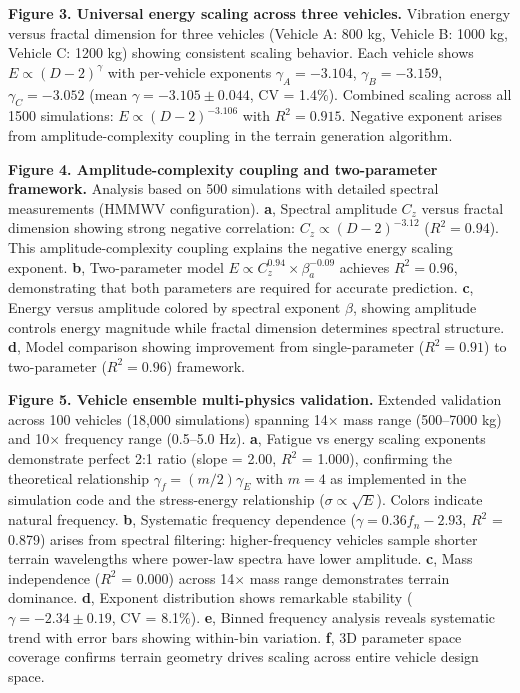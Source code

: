 \documentclass[11pt,letterpaper]{article}
\begin{document}
\textbf{Figure 3. Universal energy scaling across three vehicles.} 
Vibration energy versus fractal dimension for three vehicles (Vehicle A: 800 kg, Vehicle B: 1000 kg, Vehicle C: 1200 kg) showing consistent scaling behavior. Each vehicle shows $E \propto (D-2)^{\gamma}$ with per-vehicle exponents $\gamma_A = -3.104$, $\gamma_B = -3.159$, $\gamma_C = -3.052$ (mean $\gamma = -3.105 \pm 0.044$, CV = 1.4\%). Combined scaling across all 1500 simulations: $E \propto (D-2)^{-3.106}$ with $R^2 = 0.915$. Negative exponent arises from amplitude-complexity coupling in the terrain generation algorithm.


\textbf{Figure 4. Amplitude-complexity coupling and two-parameter framework.} 
Analysis based on 500 simulations with detailed spectral measurements (HMMWV configuration). 
\textbf{a}, Spectral amplitude $C_z$ versus fractal dimension showing strong negative correlation: $C_z \propto (D-2)^{-3.12}$ ($R^2 = 0.94$). This amplitude-complexity coupling explains the negative energy scaling exponent. 
\textbf{b}, Two-parameter model $E \propto C_z^{0.94} \times \beta_a^{-0.09}$ achieves $R^2 = 0.96$, demonstrating that both parameters are required for accurate prediction. 
\textbf{c}, Energy versus amplitude colored by spectral exponent $\beta$, showing amplitude controls energy magnitude while fractal dimension determines spectral structure. 
\textbf{d}, Model comparison showing improvement from single-parameter ($R^2 = 0.91$) to two-parameter ($R^2 = 0.96$) framework.

\textbf{Figure 5. Vehicle ensemble multi-physics validation.} 
Extended validation across 100 vehicles (18,000 simulations) spanning 14$\times$ mass range (500--7000 kg) and 10$\times$ frequency range (0.5--5.0 Hz). 
\textbf{a}, Fatigue vs energy scaling exponents demonstrate perfect 2:1 ratio (slope = 2.00, $R^2$ = 1.000), confirming the theoretical relationship $\gamma_f = (m/2)\gamma_E$ with $m = 4$ as implemented in the simulation code and the stress-energy relationship ($\sigma \propto \sqrt{E}$). Colors indicate natural frequency. 
\textbf{b}, Systematic frequency dependence ($\gamma = 0.36 f_n - 2.93$, $R^2$ = 0.879) arises from spectral filtering: higher-frequency vehicles sample shorter terrain wavelengths where power-law spectra have lower amplitude. 
\textbf{c}, Mass independence ($R^2$ = 0.000) across 14$\times$ mass range demonstrates terrain dominance. 
\textbf{d}, Exponent distribution shows remarkable stability ($\gamma = -2.34 \pm 0.19$, CV = 8.1\%). 
\textbf{e}, Binned frequency analysis reveals systematic trend with error bars showing within-bin variation. 
\textbf{f}, 3D parameter space coverage confirms terrain geometry drives scaling across entire vehicle design space.
\end{document}
